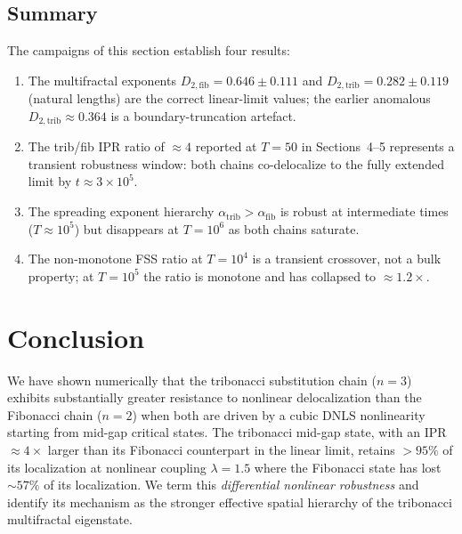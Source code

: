 \documentclass[12pt,a4paper]{article}
\begin{document}
\subsection{Summary}
\label{subsec:fss-summary}

The campaigns of this section establish four results:

\begin{enumerate}
  \item The multifractal exponents $D_{2,\mathrm{fib}} = 0.646 \pm 0.111$
        and $D_{2,\mathrm{trib}} = 0.282 \pm 0.119$ (natural lengths) are
        the correct linear-limit values; the earlier anomalous
        $D_{2,\mathrm{trib}} \approx 0.364$ is a boundary-truncation
        artefact.
  \item The trib/fib IPR ratio of $\approx 4$ reported at $T = 50$
        in Sections~4--5 represents a transient
        robustness window: both chains co-delocalize to the fully extended
        limit by $t \approx 3 \times 10^5$.
  \item The spreading exponent hierarchy
        $\alpha_{\mathrm{trib}} > \alpha_{\mathrm{fib}}$ is robust at
        intermediate times ($T \approx 10^5$) but disappears at $T = 10^6$
        as both chains saturate.
  \item The non-monotone FSS ratio at $T = 10^4$ is a transient crossover,
        not a bulk property; at $T = 10^5$ the ratio is monotone and has
        collapsed to $\approx 1.2\times$.
\end{enumerate}


\section{Conclusion}

We have shown numerically that the tribonacci substitution chain ($n=3$)
exhibits substantially greater resistance to nonlinear delocalization than the
Fibonacci chain ($n=2$) when both are driven by a cubic DNLS nonlinearity
starting from mid-gap critical states. The tribonacci mid-gap state, with an
IPR $\approx 4\times$ larger than its Fibonacci counterpart in the linear
limit, retains $> 95\%$ of its localization at nonlinear coupling $\lambda =
1.5$ where the Fibonacci state has lost $\sim 57\%$ of its localization. We
term this \emph{differential nonlinear robustness} and identify its mechanism
as the stronger effective spatial hierarchy of the tribonacci multifractal
eigenstate.
\end{document}
